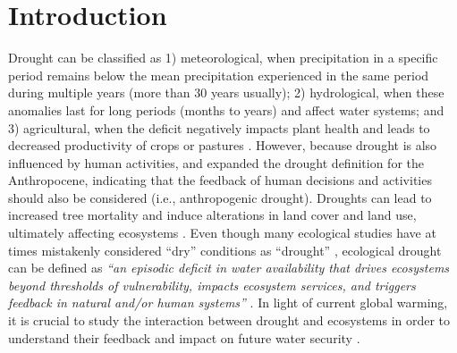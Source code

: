 \documentclass[
  authoryear,
  preprint,
  3p,
  onecolumn]{elsarticle}
\begin{document}
\captionsetup{justification=raggedright,singlelinecheck=false}

\section{Introduction}\label{introduction}

Drought can be classified as 1) meteorological, when precipitation in a
specific period remains below the mean precipitation experienced in the
same period during multiple years (more than 30 years usually); 2)
hydrological, when these anomalies last for long periods (months to
years) and affect water systems; and 3) agricultural, when the deficit
negatively impacts plant health and leads to decreased productivity of
crops or pastures \citep{Wilhite1985}. However, because drought is also
influenced by human activities, \citet{Loon2016} and
\citet{AghaKouchak2021} expanded the drought definition for the
Anthropocene, indicating that the feedback of human decisions and
activities should also be considered (i.e., anthropogenic drought).
Droughts can lead to increased tree mortality \citep{Cheng2024} and
induce alterations in land cover and land use, ultimately affecting
ecosystems \citep{Crausbay2017}. Even though many ecological studies
have at times mistakenly considered ``dry'' conditions as ``drought''
\citep{Slette2019}, ecological drought can be defined as \emph{``an
episodic deficit in water availability that drives ecosystems beyond
thresholds of vulnerability, impacts ecosystem services, and triggers
feedback in natural and/or human systems''} \citep{Crausbay2017}. In
light of current global warming, it is crucial to study the interaction
between drought and ecosystems in order to understand their feedback and
impact on future water security \citep{Bakker2012}.
\end{document}
